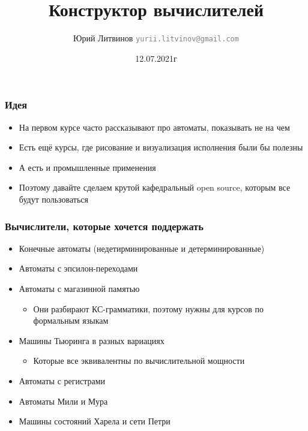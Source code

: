 \documentclass[xetex,mathserif,serif]{beamer}
\title{Конструктор вычислителей}
\author[Юрий Литвинов]{Юрий Литвинов \newline \textcolor{gray}{\small\texttt{yurii.litvinov@gmail.com}}}
\date{12.07.2021г}
\begin{document}
    \frame{\titlepage}

    \begin{frame}
        \frametitle{Идея}
        \begin{itemize}
            \item На первом курсе часто рассказывают про автоматы, показывать не на чем
            \item Есть ещё курсы, где рисование и визуализация исполнения были бы полезны
            \item А есть и промышленные применения
            \item Поэтому давайте сделаем крутой кафедральный open source, которым все будут пользоваться
        \end{itemize}
    \end{frame}

    \begin{frame}
        \frametitle{Вычислители, которые хочется поддержать}
        \begin{itemize}
            \item Конечные автоматы (недетирминированные и детерминированные)
            \item Автоматы с эпсилон-переходами
            \item Автоматы с магазинной памятью
            \begin{itemize}
                \item Они разбирают КС-грамматики, поэтому нужны для курсов по формальным языкам
            \end{itemize}
            \item Машины Тьюринга в разных вариациях
            \begin{itemize}
                \item Которые все эквивалентны по вычислительной мощности
            \end{itemize}
            \item Автоматы с регистрами
            \item Автоматы Мили и Мура
            \item Машины состояний Харела и сети Петри
        \end{itemize}
    \end{frame}
\end{document}
